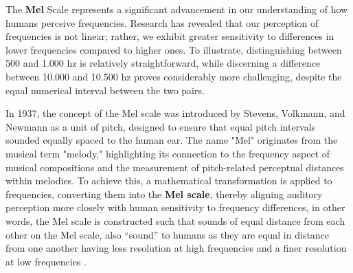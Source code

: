 

The \textbf{Mel} Scale represents a significant advancement in our understanding of how humans perceive frequencies. Research has revealed that our perception of frequencies is not linear; rather, we exhibit greater sensitivity to differences in lower frequencies compared to higher ones. To illustrate, distinguishing between 500 and 1.000 \gls{hz} is relatively straightforward, while discerning a difference between 10.000 and 10.500 \gls{hz} proves considerably more challenging, despite the equal numerical interval between the two pairs. 

In 1937, the concept of the Mel scale was introduced by Stevens, Volkmann, and Newmann as a unit of pitch, designed to ensure that equal pitch intervals sounded equally spaced to the human ear. The name "Mel" originates from the musical term "melody," highlighting its connection to the frequency aspect of musical compositions and the measurement of pitch-related perceptual distances within melodies. To achieve this, a mathematical transformation is applied to frequencies, converting them into the \textbf{Mel scale}, thereby aligning auditory perception more closely with human sensitivity to frequency differences, in other words, the Mel scale is constructed such that sounds of equal distance from each other on the Mel scale, also “sound” to humans as they are equal in distance from one another having less resolution at high frequencies and a finer resolution at low frequencies \cite{Moore2013}. %


